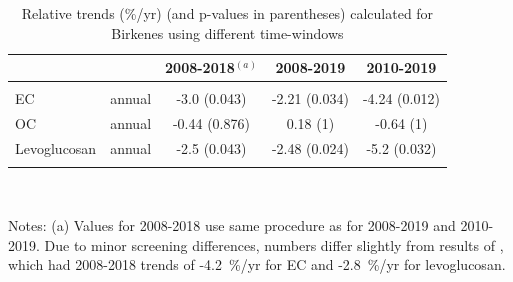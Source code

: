 \begin{table}[H]
\centering
\parbox{11.9cm}{
\caption{Relative trends (\%/yr) (and p-values in parentheses) calculated for Birkenes 
    using different time-windows \label{tab:BirkenesTrends}}}
\begin{tabular}{lcccc}
\toprule
     &         & 2008-2018$^{(a)}$& 2008-2019     & 2010-2019       \\
\midrule
 & & & & \\
EC   & annual  & -3.0 (0.043)        &  -2.21 (0.034)   & -4.24 (0.012) \\
OC   & annual  &  -0.44 (0.876)      &   0.18 (1)     & -0.64 (1)   \\
Levoglucosan & annual  & -2.5 (0.043)        &  -2.48 (0.024)   & -5.2  (0.032) \\
& & & & \\
\bottomrule 
\end{tabular}\\
\parbox{11.9cm}{

Notes:
(a) Values for 2008-2018 use same procedure as for 2008-2019 and 2010-2019.
Due to minor screening differences, numbers
differ slightly from results of \citet{Yttri2021}, which had 2008-2018 trends of -4.2~\%/yr for EC and -2.8~\%/yr for levoglucosan.\\
\\
}
\end{table}


